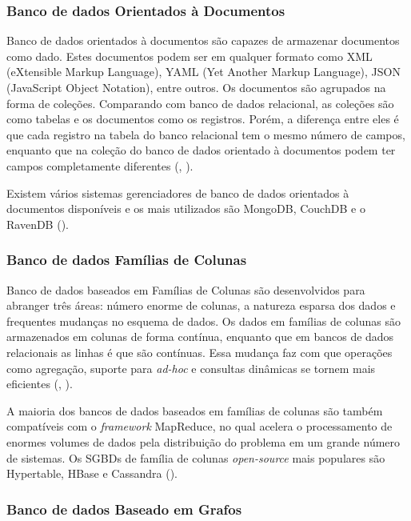 \subsubsection{Banco de dados Orientados à Documentos}

Banco de dados orientados à documentos são capazes de armazenar documentos como dado. Estes documentos podem ser em qualquer formato como XML (eXtensible Markup Language), YAML (Yet Another Markup Language), JSON (JavaScript Object Notation), entre outros. Os documentos são agrupados na forma de coleções. Comparando com banco de dados relacional, as coleções são como tabelas e os documentos como os registros. Porém, a diferença entre eles é que cada registro na tabela do banco relacional tem o mesmo número de campos, enquanto que na coleção do banco de dados orientado à documentos podem ter campos completamente diferentes (\cite{kaur:2013}, \cite{fowler:2013}).

Existem vários sistemas gerenciadores de banco de dados orientados à documentos disponíveis e os mais utilizados são MongoDB, CouchDB e o RavenDB (\cite{kaur:2013}).

\subsubsection{Banco de dados Famílias de Colunas}

Banco de dados baseados em Famílias de Colunas são desenvolvidos para abranger três áreas: número enorme de colunas, a natureza esparsa dos dados e frequentes mudanças no esquema de dados. Os dados em famílias de colunas são armazenados em colunas de forma contínua, enquanto que em bancos de dados relacionais as linhas é que são contínuas. Essa mudança faz com que operações como agregação, suporte para \textit{ad-hoc} e consultas dinâmicas se tornem mais eficientes (\cite{kaur:2013}, \cite{fowler:2013}).

A maioria dos bancos de dados baseados em famílias de colunas são também compatíveis com o \textit{framework} MapReduce, no qual acelera o processamento de enormes volumes de dados pela distribuição do problema em um grande número de sistemas. Os SGBDs de família de colunas \textit{open-source} mais populares são Hypertable, HBase e Cassandra (\cite{kaur:2013}).

\subsubsection{Banco de dados Baseado em Grafos}

